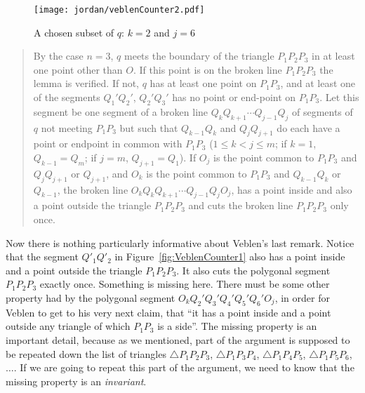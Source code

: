 \begin{figure}
\centering
\texttt{[image: jordan/veblenCounter2.pdf]}
\caption{A chosen subset of $q$: $k=2$ and $j=6$}
\label{fig:VeblenCounter2}
\end{figure}

\begin{quotation}
By the case $n=3$, $q$ meets the boundary of the triangle $P_1P_2P_3$ in at least one point other than $O$. If this point is on the broken line $P_1P_2P_3$ the lemma is verified. If not, $q$ has at least one point on $P_1P_3$, and at least one of the segments $Q_1'Q_2'$, $Q_2'Q_3'$ has no point or end-point on $P_1P_3$. Let this segment be one segment of a broken line $Q_kQ_{k+1}\cdots Q_{j-1}Q_j$ of segments of $q$ not meeting $P_1P_3$ but such that $Q_{k-1}Q_k$ and $Q_jQ_{j+1}$ do each have a point or endpoint in common with $P_1P_3$ ($1 \leq k < j \leq m$; if $k = 1$, $Q_{k-1} = Q_m$; if $j = m$, $Q_{j+1} = Q_1$). If $O_j$ is the point common to $P_1P_3$ and $Q_jQ_{j+1}$ or $Q_{j+1}$, and $O_k$ is the point common to $P_1P_3$ and $Q_{k-1}Q_k$ or $Q_{k-1}$, the broken line $O_kQ_kQ_{k+1}\cdots Q_{j-1}Q_jO_j$, has a point inside and also a point outside the triangle $P_1P_2P_3$ and cuts the broken line $P_1P_2P_3$ only once.
\end{quotation}

Now there is nothing particularly informative about Veblen's last remark. Notice that the segment $Q'_1Q'_2$ in Figure~\ref{fig:VeblenCounter1} also has a point inside and a point outside the triangle $P_1P_2P_3$. It also cuts the polygonal segment $P_1P_2P_3$ exactly once. Something is missing here. There must be some other property had by the polygonal segment $O_kQ_2'Q_3'Q_4'Q_5'Q_6'O_j$, in order for Veblen to get to his very next claim, that ``it has a point inside and a point outside any triangle of which $P_1P_3$ is a side''. The missing property is an important detail, because as we mentioned, part of the argument is supposed to be repeated down the list of triangles $\triangle P_1P_2P_3$, $\triangle P_1P_3P_4$, $\triangle P_1P_4P_5$, $\triangle P_1P_5P_6$, $\ldots$. If we are going to repeat this part of the argument, we need to know that the missing property is an \emph{invariant}.

